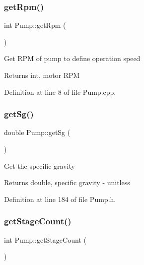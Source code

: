 \subsubsection{\texorpdfstring{get\+Rpm()}{getRpm()}}
{\footnotesize\ttfamily int Pump\+::get\+Rpm (\begin{DoxyParamCaption}{ }\end{DoxyParamCaption})}

Get R\+PM of pump to define operation speed

\begin{DoxyReturn}{Returns}
int, motor R\+PM 
\end{DoxyReturn}


Definition at line 8 of file Pump.\+cpp.

\mbox{\label{class_pump_ae30109b8533176cc1c7c80cf9df95631}} 
\subsubsection{\texorpdfstring{get\+Sg()}{getSg()}}
{\footnotesize\ttfamily double Pump\+::get\+Sg (\begin{DoxyParamCaption}{ }\end{DoxyParamCaption})\hspace{0.3cm}{\ttfamily [inline]}}

Get the specific gravity

\begin{DoxyReturn}{Returns}
double, specific gravity -\/ unitless 
\end{DoxyReturn}


Definition at line 184 of file Pump.\+h.

\mbox{\label{class_pump_a2a8754f53b289dc41f3220adc4eb56e1}} 
\subsubsection{\texorpdfstring{get\+Stage\+Count()}{getStageCount()}}
{\footnotesize\ttfamily int Pump\+::get\+Stage\+Count (\begin{DoxyParamCaption}{ }\end{DoxyParamCaption})\hspace{0.3cm}{\ttfamily [inline]}}

